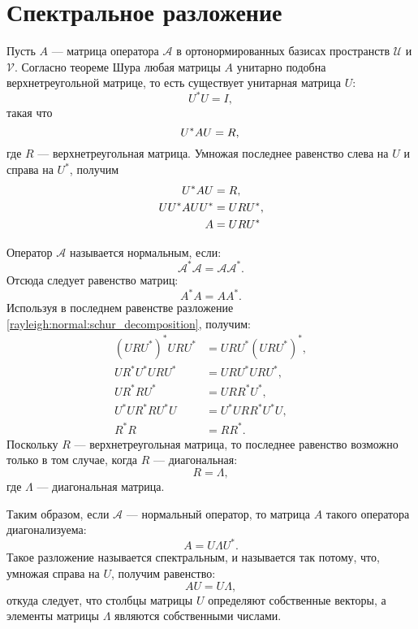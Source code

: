 \section{Спектральное разложение}

Пусть $A$ --- матрица оператора $\mathcal{A}$ в ортонормированных базисах пространств $\mathcal{U}$ и $\mathcal{V}$. Согласно теореме Шура любая матрицы $A$
унитарно подобна верхнетреугольной матрице, то есть существует унитарная матрица $U$:
\[
    U^* U = I,
\]
такая что
\[
    U^* A U = R, \\
\]
где $R$ --- верхнетреугольная матрица. Умножая последнее равенство слева на $U$ и справа на $U^*$, получим
\begin{align}
    U^* A U & = R,
    \notag \\
    U U^* A U U^* & = U R U^*,
    \notag \\
    A & = U R U^*
    \label{rayleigh:normal:schur_decomposition}
\end{align}

Оператор $\mathcal{A}$ называется нормальным, если:
\[
    \mathcal{A}^* \mathcal{A} = \mathcal{A} \mathcal{A}^* .
\]
Отсюда следует равенство матриц:
\[
    A^* A = A A^* .
\]
Используя в последнем равенстве разложение \eqref{rayleigh:normal:schur_decomposition}, получим:
\begin{align*}
    \left ( U R U^* \right ) ^* U R U^* & = U R U^* \left ( U R U^* \right )^* , \\
    U R^* U^* U R U^* & = U R U^* U R U^* , \\
    U R^* R U^* & = U R R^* U^* , \\
    U^* U R^* R U^* U & = U^* U R R^* U^* U, \\
    R^* R & = R R^* .
\end{align*}
Поскольку $R$ --- верхнетреугольная матрица, то последнее равенство возможно только в том случае, когда $R$ --- диагональная:
\[
    R = \Lambda,
\]
где $\Lambda$ --- диагональная матрица.

Таким образом, если $\mathcal{A}$ --- нормальный оператор, то матрица $A$ такого оператора диагонализуема:
\begin{equation}
    \label{rayleigh:normal:spectral_decomposition}
    A = U \Lambda U^* .
\end{equation}
Такое разложение называется спектральным, и называется так потому, что, умножая справа на $U$, получим равенство:
\[
    A U = U \Lambda,
\]
откуда следует, что столбцы матрицы $U$ определяют собственные векторы, а элементы матрицы $\Lambda$ являются собственными числами.


